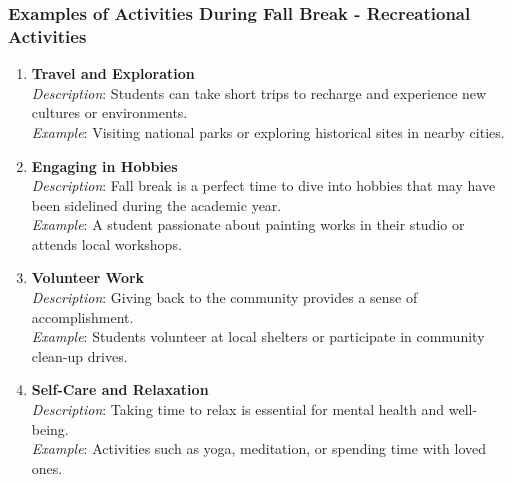 \documentclass[aspectratio=169]{beamer}
\begin{document}
\begin{frame}[fragile]
    \frametitle{Examples of Activities During Fall Break - Recreational Activities}
    \begin{enumerate}
        \item \textbf{Travel and Exploration}\\
        \textit{Description}: Students can take short trips to recharge and experience new cultures or environments.\\
        \textit{Example}: Visiting national parks or exploring historical sites in nearby cities.

        \item \textbf{Engaging in Hobbies}\\
        \textit{Description}: Fall break is a perfect time to dive into hobbies that may have been sidelined during the academic year.\\
        \textit{Example}: A student passionate about painting works in their studio or attends local workshops.

        \item \textbf{Volunteer Work}\\
        \textit{Description}: Giving back to the community provides a sense of accomplishment.\\
        \textit{Example}: Students volunteer at local shelters or participate in community clean-up drives.

        \item \textbf{Self-Care and Relaxation}\\
        \textit{Description}: Taking time to relax is essential for mental health and well-being.\\
        \textit{Example}: Activities such as yoga, meditation, or spending time with loved ones.
    \end{enumerate}
\end{frame}
\end{document}
